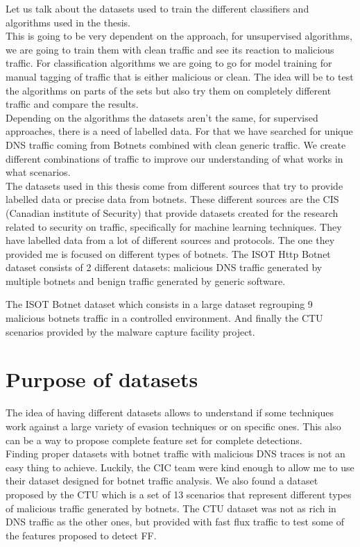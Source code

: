 Let us talk about the datasets used to train the different classifiers and algorithms used in the thesis.\\
This is going to be very dependent on the approach, for unsupervised algorithms, we are going to train them with clean traffic and see its reaction to malicious traffic. For classification algorithms we are going to go for model training for manual tagging of traffic that is either malicious or clean.
The idea will be to test the algorithms on parts of the sets but also try them on completely different traffic and compare the results.
\\

Depending on the algorithms the datasets aren't the same, for supervised approaches, there is a need of labelled data. For that we have searched for unique DNS traffic coming from Botnets combined with clean generic traffic. We create different combinations of traffic to improve our understanding of what works in what scenarios.\\


The datasets used in this thesis come from different sources that try to provide labelled data or precise data from botnets. These different sources are the CIS (Canadian institute of Security) that provide datasets created for the research related to security on traffic, specifically for machine learning techniques. They have labelled data from a lot of different sources and protocols. The one they provided me is focused on different types of botnets.
The ISOT Http Botnet dataset consists of 2 different datasets: malicious DNS traffic generated by multiple botnets and benign traffic generated by generic software. 

The ISOT Botnet dataset which consists in a large dataset regrouping 9 malicious botnets traffic in a controlled environment. 
And finally the CTU scenarios provided by the malware capture facility project.

\section{Purpose of datasets}
The idea of having different datasets allows to understand if some techniques work against a large variety of evasion techniques or on specific ones. This also can be a way to propose complete feature set for complete detections.
\\
Finding proper datasets with botnet traffic with malicious DNS traces is not an easy thing to achieve. Luckily, the CIC team were kind enough to allow me to use their dataset designed for botnet traffic analysis. We also found a dataset proposed by the CTU which is a set of 13 scenarios that represent different types of malicious traffic generated by botnets. The CTU dataset was not as rich in DNS traffic as the other ones, but provided with fast flux traffic to test some of the features proposed to detect FF.

